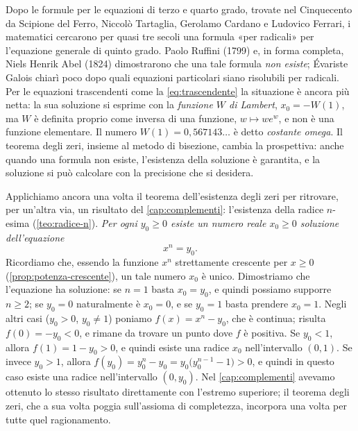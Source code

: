 \begin{notastorica}
Dopo le formule per le equazioni di terzo e quarto grado, trovate nel Cinquecento da
Scipione del Ferro, Niccolò Tartaglia, Gerolamo Cardano e Ludovico Ferrari, i matematici
cercarono per quasi tre secoli una formula «per radicali» per l'equazione generale di
quinto grado. Paolo Ruffini (1799) e, in forma completa, Niels Henrik Abel (1824)
dimostrarono che una tale formula \emph{non esiste}; Évariste Galois chiarì poco dopo
quali equazioni particolari siano risolubili per radicali. Per le equazioni
trascendenti come la \eqref{eq:trascendente} la situazione è ancora più netta: la sua
soluzione si esprime con la \emph{funzione $W$ di Lambert}, $x_{0}=-W(1)$, ma $W$ è
definita proprio come inversa di una funzione, $w\mapsto we^{w}$, e non è una funzione
elementare. Il numero $W(1)=0{,}567143\ldots$ è detto \emph{costante omega}. Il teorema
degli zeri, insieme al metodo di bisezione, cambia la prospettiva: anche quando una
formula non esiste, l'esistenza della soluzione è garantita, e la soluzione si può
calcolare con la precisione che si desidera.
\end{notastorica}

Applichiamo ancora una volta il teorema dell'esistenza degli zeri per ritrovare, per
un'altra via, un risultato del \cref{cap:complementi}: l'esistenza della radice $n$-esima
(\cref{teo:radice-n}). \emph{Per ogni
$y_{0}\ge0$ esiste un numero reale $x_{0}\ge0$ soluzione dell'equazione}
\begin{equation}\label{eq:radice-zeri}
  x^{n}=y_{0} .
\end{equation}
Ricordiamo che, essendo la funzione $x^{n}$ strettamente crescente per $x\ge0$
(\cref{prop:potenza-crescente}), un tale numero $x_{0}$ è unico. Dimostriamo che
l'equazione ha soluzione: se $n=1$ basta $x_{0}=y_{0}$, e quindi possiamo supporre
$n\ge2$; se $y_{0}=0$ naturalmente è $x_{0}=0$, e se $y_{0}=1$ basta prendere
$x_{0}=1$. Negli altri casi ($y_{0}>0$, $y_{0}\neq1$) poniamo $f(x)=x^{n}-y_{0}$, che è
continua; risulta
$f(0)=-y_{0}<0$, e rimane da trovare un punto dove $f$ è positiva. Se $y_{0}<1$, allora
$f(1)=1-y_{0}>0$, e quindi esiste una radice $x_{0}$ nell'intervallo $(0,1)$. Se invece
$y_{0}>1$, allora $f(y_{0})=y_{0}^{n}-y_{0}=y_{0}\bigl(y_{0}^{n-1}-1\bigr)>0$, e quindi in
questo caso esiste una radice nell'intervallo $(0,y_{0})$. Nel \cref{cap:complementi}
avevamo ottenuto lo stesso risultato direttamente con l'estremo superiore; il teorema
degli zeri, che a sua volta poggia sull'assioma di completezza, incorpora una volta per
tutte quel ragionamento.

